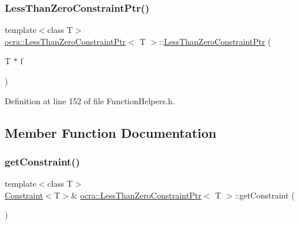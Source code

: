 \subsubsection{\texorpdfstring{Less\+Than\+Zero\+Constraint\+Ptr()}{LessThanZeroConstraintPtr()}\hspace{0.1cm}{\footnotesize\ttfamily [2/2]}}
{\footnotesize\ttfamily template$<$class T$>$ \\
\hyperlink{classocra_1_1LessThanZeroConstraintPtr}{ocra\+::\+Less\+Than\+Zero\+Constraint\+Ptr}$<$ T $>$\+::\hyperlink{classocra_1_1LessThanZeroConstraintPtr}{Less\+Than\+Zero\+Constraint\+Ptr} (\begin{DoxyParamCaption}\item[{T $\ast$}]{f }\end{DoxyParamCaption})\hspace{0.3cm}{\ttfamily [inline]}}



Definition at line 152 of file Function\+Helpers.\+h.



\subsection{Member Function Documentation}
\hypertarget{classocra_1_1LessThanZeroConstraintPtr_aa0d2d38bfa583d77e6b59c683978f3be}{}\label{classocra_1_1LessThanZeroConstraintPtr_aa0d2d38bfa583d77e6b59c683978f3be} 
\subsubsection{\texorpdfstring{get\+Constraint()}{getConstraint()}\hspace{0.1cm}{\footnotesize\ttfamily [1/2]}}
{\footnotesize\ttfamily template$<$class T$>$ \\
\hyperlink{classocra_1_1Constraint}{Constraint}$<$T$>$\& \hyperlink{classocra_1_1LessThanZeroConstraintPtr}{ocra\+::\+Less\+Than\+Zero\+Constraint\+Ptr}$<$ T $>$\+::get\+Constraint (\begin{DoxyParamCaption}{ }\end{DoxyParamCaption})\hspace{0.3cm}{\ttfamily [inline]}}



